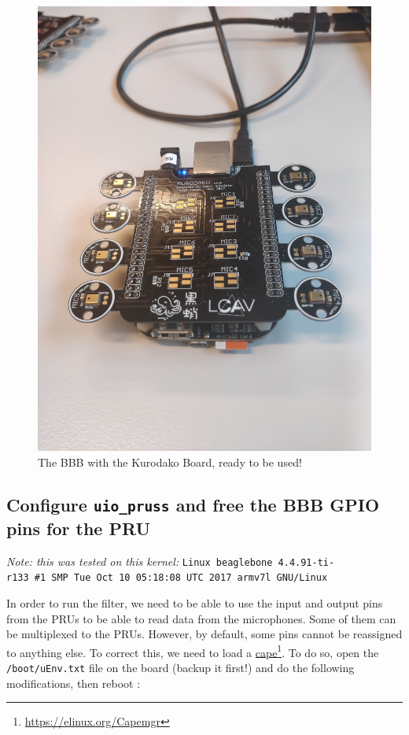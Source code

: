 \documentclass[]{report}
\begin{document}
\begin{figure}
\centering
\includegraphics[width=0.4\linewidth]{Pictures/BBBkurodako.jpg}
\caption{The BBB with the Kurodako Board, ready to be used!}
\end{figure}


\hypertarget{configure-uio-pruss-and-free-the-gpio-pins-for-the-pru}{%
	\subsection{\texorpdfstring{Configure \texttt{uio\_pruss} and free
			the BBB GPIO pins for the
			PRU}{Configure uio\textunderscore pruss and free the BBB GPIO pins for the PRU}}\label{configure-uio-pruss-and-free-the-gpio-pins-for-the-pru}}

\emph{Note: this was tested on this kernel:}
\texttt{Linux beaglebone\ 4.4.91-ti-r133\ \#1\ SMP\ Tue\ Oct\ 10\ 05:18:08\ UTC\ 2017\ armv7l\ GNU/Linux}

In order to run the filter, we need to be able to use the input and
output pins from the PRUs to be able to read data from the microphones.
Some of them can be multiplexed to the PRUs. However, by default, some
pins cannot be reassigned to anything else. To correct this, we need to
load a \href{https://elinux.org/Capemgr}{cape}\footnote{\url{https://elinux.org/Capemgr}}. To do so, open the
\texttt{/boot/uEnv.txt} file on the board (backup it first!) and do the
following modifications, then reboot :\\
\end{document}
